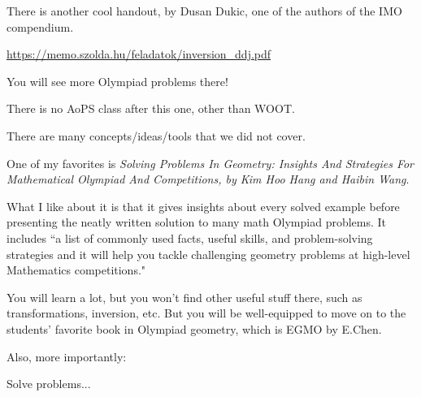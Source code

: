 There is another cool handout, by Dusan Dukic, one of the authors of the IMO compendium.

\url{https://memo.szolda.hu/feladatok/inversion_ddj.pdf}

You will see more Olympiad problems there!






There is no AoPS class after this one, other than WOOT.

There are many concepts/ideas/tools that we did not cover.


One of my favorites is \emph{Solving Problems In Geometry: Insights And Strategies For Mathematical Olympiad And Competitions, by Kim Hoo Hang and Haibin Wang}.

What I like about it is that it gives insights about every solved example before presenting the neatly written solution to many math Olympiad problems. It includes ``a list of commonly used facts, useful skills, and problem-solving strategies and it will help you tackle challenging geometry problems at high-level Mathematics competitions."

You will learn a lot, but you won't find other useful stuff there, such as transformations, inversion, etc. But you will be well-equipped to move on to the students' favorite book in Olympiad geometry, which is EGMO by E.Chen.

Also, more importantly:

Solve problems...

